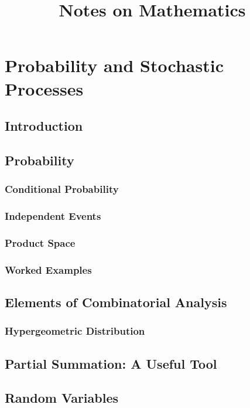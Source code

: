 \documentclass{report}
\title{Notes on Mathematics}
\begin{document}
\maketitle
\tableofcontents

\chapter{Probability and Stochastic Processes}
\section{Introduction}


\section{Probability}

\subsection{Conditional Probability}

\subsection{Independent Events}

\subsection{Product Space} 


\subsection{Worked Examples}


\section{Elements of Combinatorial Analysis}

\subsection{Hypergeometric Distribution}

\section[Partial Summation]{Partial Summation: A Useful Tool}


\section{Random Variables}

\end{document}
